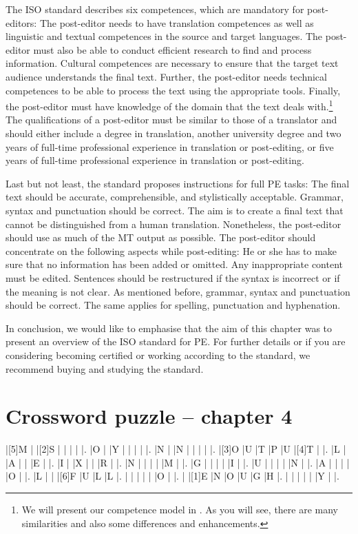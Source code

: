 The ISO standard describes six competences, which are mandatory for post-editors: The post-editor needs to have translation competences as well as linguistic and textual competences in the source and target languages. The post-editor must also be able to conduct efficient research to find and process information. Cultural competences are necessary to ensure that the target text audience understands the final text. Further, the post-editor needs technical competences to be able to process the text using the appropriate tools. Finally, the post-editor must have knowledge of the domain that the text deals with.\footnote{We will present our competence model in . As you will see, there are many similarities and also some differences and enhancements.} The qualifications of a post-editor must be similar to those of a translator and should either include a degree in translation, another university degree and two years of full-time professional experience in translation or post-editing, or five years of full-time professional experience in translation or post-editing.

Last but not least, the standard proposes instructions for full PE tasks: The final text should be accurate, comprehensible, and stylistically acceptable. Grammar, syntax and punctuation should be correct. The aim is to create a final text that cannot be distinguished from a human translation. Nonetheless, the post-editor should use as much of the MT output as possible. The post-editor should concentrate on the following aspects while post-editing: He or she has to make sure that no information has been added or omitted. Any inappropriate content must be edited. Sentences should be restructured if the syntax is incorrect or if the meaning is not clear. As mentioned before, grammar, syntax and punctuation should be correct. The same applies for spelling, punctuation and hyphenation.

In conclusion, we would like to emphasise that the aim of this chapter was to present an overview of the ISO standard for PE. For further details or if you are considering becoming certified or working according to the standard, we recommend buying and studying the standard.


\newpage

\section*{Crossword puzzle -- chapter 4}

\begin{Puzzle}{7}{14}
|[5]M	|{}	|[2]S	|{}	|{}	|{}	|{}	|.
|O	|{}	|Y	|{}	|{}	|{}	|{}	|.
|N	|{}	|N	|{}	|{}	|{}	|{}	|.
|[3]O	|U	|T	|P	|U	|[4]T	|{}	|.
|L	|{}	|A	|{}	|{}	|E	|{}	|.
|I	|{}	|X	|{}	|{}	|R	|{}	|.
|N	|{}	|{}	|{}	|{}	|M	|{}	|.
|G	|{}	|{}	|{}	|{}	|I	|{}	|.
|U	|{}	|{}	|{}	|{}	|N	|{}	|.
|A	|{}	|{}	|{}	|{}	|O	|{}	|.
|L	|{}	|{}	|[6]F	|U	|L	|L	|.
|{}	|{}	|{}	|{}	|{}	|O	|{}	|.
|{}	|[1]E	|N	|O	|U	|G	|H	|.
|{}	|{}	|{}	|{}	|{}	|Y	|{}	|.
\end{Puzzle}

